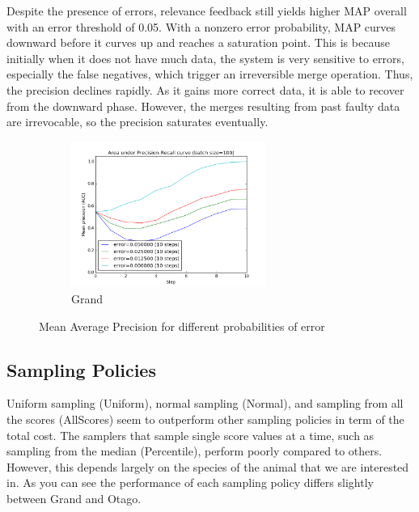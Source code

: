 Despite the presence of errors, relevance feedback still yields higher MAP
overall with an error threshold of 0.05. With a nonzero error probability, MAP
curves downward before it curves up and reaches a saturation point. This is
because initially when it does not have much data, the system is very sensitive
to errors, especially the false negatives, which trigger an irreversible merge
operation. Thus, the precision declines rapidly.  As it gains more correct data,
it is able to recover from the downward phase. However, the merges
resulting from past faulty data are irrevocable, so the precision saturates
eventually.

\begin{figure}[htb]
  \centering
  \begin{subfigure}[t]{\textwidth}
      \centering
      \includegraphics[width=0.7\textwidth]{errors/graoc}
      \caption{Grand}
  \end{subfigure}%
  \caption{Mean Average Precision for different probabilities of error}
  \label{fig:errors_aoc} %
\end{figure}

\subsection{Sampling Policies} %
\label{sub:sampling_policies_res}

Uniform sampling (Uniform), normal sampling (Normal), and sampling from all the
scores (AllScores) seem to outperform other sampling policies in term of the
total cost. The samplers that sample single score values at a time, such as
sampling from the median (Percentile), perform poorly compared to others. However,
this depends largely on the species of the animal that we are interested in. As
you can see the performance of each sampling policy differs slightly
between Grand and Otago.

